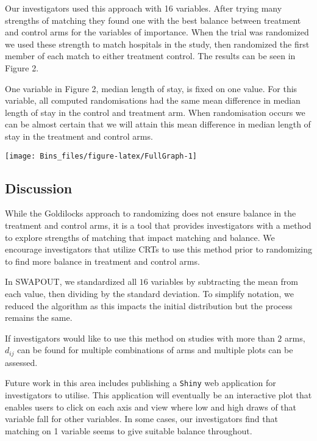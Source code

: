 \documentclass[]{sagej}
\begin{document}
Our investigators used this approach with 16 variables. After trying
many strengths of matching they found one with the best balance between
treatment and control arms for the variables of importance. When the
trial was randomized we used these strength to match hospitals in the
study, then randomized the first member of each match to either
treatment control. The results can be seen in Figure 2.

One variable in Figure 2, median length of stay, is fixed on one value.
For this variable, all computed randomisations had the same mean
difference in median length of stay in the control and treatment arm.
When randomisation occurs we can be almost certain that we will attain
this mean difference in median length of stay in the treatment and
control arms.

\begin{center}\texttt{[image: Bins\_files/figure-latex/FullGraph-1]} \end{center}

\subsection{Discussion}\label{discussion}

While the Goldilocks approach to randomizing does not ensure balance in
the treatment and control arms, it is a tool that provides investigators
with a method to explore strengths of matching that impact matching and
balance. We encourage investigators that utilize CRTs to use this method
prior to randomizing to find more balance in treatment and control arms.

In SWAPOUT, we standardized all \(16\) variables by subtracting the mean
from each value, then dividing by the standard deviation. To simplify
notation, we reduced the algorithm as this impacts the initial
distribution but the process remains the same.

If investigators would like to use this method on studies with more than
\(2\) arms, \(d_{ij}\) can be found for multiple combinations of arms
and multiple plots can be assessed.

Future work in this area includes publishing a \texttt{Shiny} web
application for investigators to utilise. This application will
eventually be an interactive plot that enables users to click on each
axis and view where low and high draws of that variable fall for other
variables. In some cases, our investigators find that matching on 1
variable seems to give suitable balance throughout.
\end{document}
